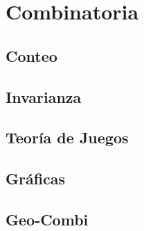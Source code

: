 
\chapter{Combinatoria}

    \section{Conteo}

    \section{Invarianza}

    \section{Teoría de Juegos}

    \section{Gráficas}

    \section{Geo-Combi}
